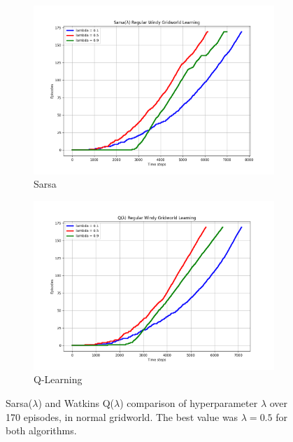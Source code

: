 \documentclass{article}
\begin{document}
\begin{figure}[h!]
  \centering
  \begin{subfigure}{0.45\textwidth} 
    \includegraphics[width=\textwidth]{sarsa_lambda_comparison.png}
    \caption{Sarsa}
  \end{subfigure}
  \hspace{0.05\textwidth}  
  \begin{subfigure}{0.45\textwidth}  
    \includegraphics[width=\textwidth]{q_lambda_comparison.png}
    \caption{Q-Learning}
  \end{subfigure}
  \caption{Sarsa($\lambda$) and Watkins Q($\lambda$) comparison of hyperparameter $\lambda$ over 170 episodes, in normal gridworld. The best value was $\lambda=0.5$ for both algorithms. }
  \label{fig:lambda_comparison}
\end{figure}
\end{document}
